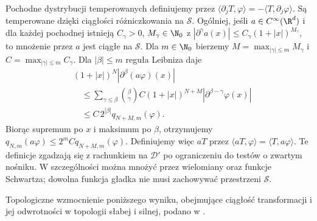 Pochodne dystrybucji temperowanych definiujemy
przez $\langle\partial_j T,\varphi\rangle
=-\langle T,\partial_j\varphi\rangle$.
Są temperowane dzięki ciągłości różniczkowania
na $\mathcal S$. Ogólniej, jeśli $a\in C^\infty(\R^d)$
i dla każdej pochodnej istnieją
$C_\gamma>0$, $M_\gamma\in\N_0$ z
$|\partial^\gamma a(x)|\le C_\gamma(1+|x|)^{M_\gamma}$,
to mnożenie przez $a$ jest ciągłe na $\mathcal S$.
Dla $m\in\N_0$ bierzemy
$M=\max_{|\gamma|\le m} M_\gamma$ i
$C=\max_{|\gamma|\le m} C_\gamma$.
Dla $|\beta|\le m$ reguła Leibniza daje
\[
 \begin{aligned}
 &(1+|x|)^N|\partial^\beta(a\varphi)(x)|\\
 &\quad\le
 \sum_{\gamma\le\beta}\binom{\beta}{\gamma}
 C(1+|x|)^{N+M}|\partial^{\beta-\gamma}\varphi(x)|\\
 &\quad\le C\,2^{|\beta|}q_{N+M,m}(\varphi).
 \end{aligned}
\]
Biorąc supremum po $x$ i maksimum po $\beta$,
otrzymujemy
$q_{N,m}(a\varphi)\le 2^m C q_{N+M,m}(\varphi)$.
Definiujemy więc $aT$ przez
$\langle aT,\varphi\rangle=\langle T,a\varphi\rangle$.
Te definicje zgadzają się z rachunkiem
na $\mathcal D'$ po ograniczeniu do testów
o zwartym nośniku. W szczególności można
mnożyć przez wielomiany oraz funkcje Schwartza;
dowolna funkcja gładka nie musi zachowywać
przestrzeni $\mathcal S$.

Topologiczne wzmocnienie poniższego wyniku, obejmujące ciągłość transformacji i jej odwrotności w topologii słabej i silnej, podano w .

